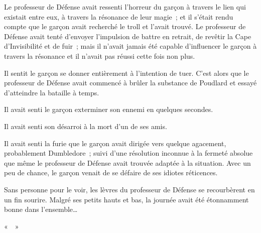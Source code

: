 Le professeur de Défense avait ressenti l'horreur du garçon à travers le lien qui existait entre eux, à travers la résonance de leur magie~; et il s'était rendu compte que le garçon avait recherché le troll et l'avait trouvé. Le professeur de Défense avait tenté d'envoyer l'impulsion de battre en retrait, de revêtir la Cape d'Invisibilité et de fuir~; mais il n'avait jamais été capable d'influencer le garçon à travers la résonance et il n'avait pas réussi cette fois non plus.

Il sentit le garçon se donner entièrement à l'intention de tuer. C'est alors que le professeur de Défense avait commencé à brûler la substance de Poudlard et essayé d'atteindre la bataille à temps.

Il avait senti le garçon exterminer son ennemi en quelques secondes.

Il avait senti son désarroi à la mort d'un de ses amis.

Il avait senti la furie que le garçon avait dirigée vers quelque agacement, probablement Dumbledore~; suivi d'une résolution inconnue à la fermeté absolue que même le professeur de Défense avait trouvée adaptée à la situation. Avec un peu de chance, le garçon venait de se défaire de ses idiotes réticences.

Sans personne pour le voir, les lèvres du professeur de Défense se recourbèrent en un fin sourire. Malgré ses petits hauts et bas, la journée avait été étonnamment bonne dans l'ensemble…

«~~»
